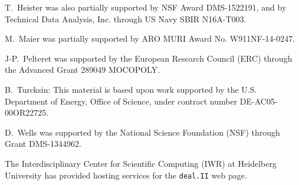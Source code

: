 \documentclass{ansarticle-preprint}
\newcommand{\specialword}[1]{\texttt{#1}}
\newcommand{\dealii}{{\specialword{deal.II}}\xspace}
\begin{document}
T.~Heister was also partially supported by NSF Award DMS-1522191, and
by Technical Data Analysis, Inc. through US Navy SBIR N16A-T003.

M.~Maier was partially supported by ARO MURI Award No. W911NF-14-0247.

J-P.~Pelteret was supported by the European Research Council (ERC) through
the Advanced Grant 289049 MOCOPOLY.

B.~Turcksin: This material is based upon work supported by the U.S.
Department of Energy, Office of Science, under contract number
DE-AC05-00OR22725.

D.~Wells was supported by the National Science Foundation (NSF) through Grant
DMS-1344962.

The Interdisciplinary Center for Scientific Computing (IWR) at Heidelberg
University has provided hosting services for the \dealii web page.


{}

\end{document}
